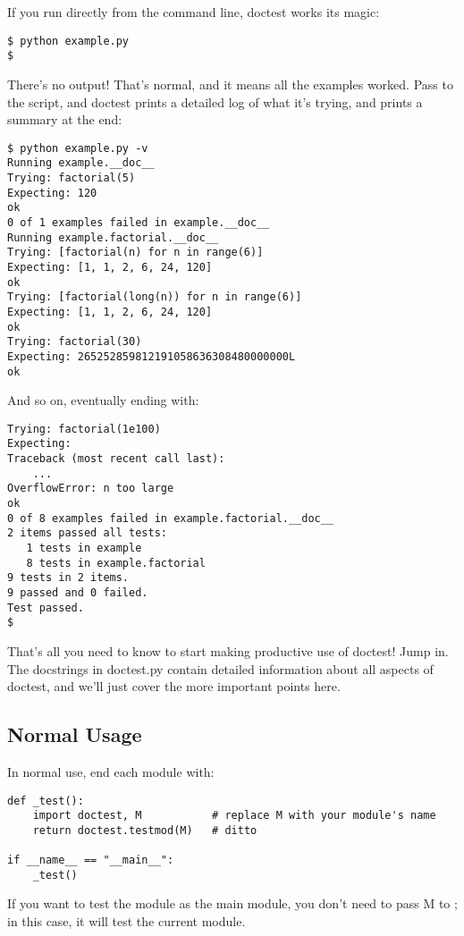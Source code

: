 If you run  directly from the command line, doctest works
its magic:

\begin{verbatim}
$ python example.py
$
\end{verbatim}

There's no output!  That's normal, and it means all the examples worked.
Pass  to the script, and doctest prints a detailed log
of what it's trying, and prints a summary at the end:

\begin{verbatim}
$ python example.py -v
Running example.__doc__
Trying: factorial(5)
Expecting: 120
ok
0 of 1 examples failed in example.__doc__
Running example.factorial.__doc__
Trying: [factorial(n) for n in range(6)]
Expecting: [1, 1, 2, 6, 24, 120]
ok
Trying: [factorial(long(n)) for n in range(6)]
Expecting: [1, 1, 2, 6, 24, 120]
ok
Trying: factorial(30)
Expecting: 265252859812191058636308480000000L
ok
\end{verbatim}

And so on, eventually ending with:

\begin{verbatim}
Trying: factorial(1e100)
Expecting:
Traceback (most recent call last):
    ...
OverflowError: n too large
ok
0 of 8 examples failed in example.factorial.__doc__
2 items passed all tests:
   1 tests in example
   8 tests in example.factorial
9 tests in 2 items.
9 passed and 0 failed.
Test passed.
$
\end{verbatim}

That's all you need to know to start making productive use of doctest!  Jump
in.  The docstrings in doctest.py contain detailed information about all
aspects of doctest, and we'll just cover the more important points here.

\subsection{Normal Usage}

In normal use, end each module  with:

\begin{verbatim}
def _test():
    import doctest, M           # replace M with your module's name
    return doctest.testmod(M)   # ditto

if __name__ == "__main__":
    _test()
\end{verbatim}

If you want to test the module as the main module, you don't need to
pass M to ; in this case, it will test the current
module.

